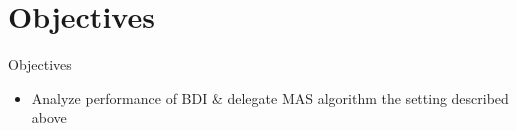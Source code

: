 \section{Objectives}


\begin{frame}{Objectives}
    \begin{itemize}
        \item Analyze performance of BDI \& delegate MAS algorithm the setting described above
    \end{itemize}
\end{frame}
